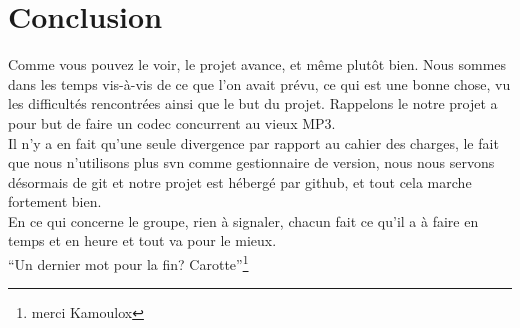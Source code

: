 \documentclass[a4paper,12pt]{article}
\begin{document}
\newpage

\section*{Conclusion}
Comme vous pouvez le voir, le projet avance, et même plutôt bien. Nous sommes
dans les temps vis-à-vis de ce que l'on avait prévu, ce qui est une bonne chose,
vu les difficultés rencontrées ainsi que le but du projet. Rappelons le notre
projet a pour but de faire un codec concurrent au vieux MP3.\\
Il n'y a en fait qu'une seule divergence par rapport au cahier des charges, le
fait que nous n'utilisons plus svn comme gestionnaire de version, nous nous
servons désormais de git et notre projet est hébergé par github, et tout cela
marche fortement bien.\\
En ce qui concerne le groupe, rien à signaler, chacun fait ce qu'il a à faire en
temps et en heure et tout va pour le mieux.\\
``Un dernier mot pour la fin? Carotte''\footnote{merci Kamoulox}\\
\end{document}
